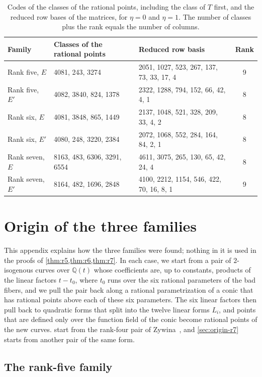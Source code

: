 \documentclass[12pt,oneside,openany]{book}
\theoremstyle{definition}
\theoremstyle{plain}
\numberwithin{equation}{chapter}
\theoremstyle{plain}
\theoremstyle{definition}
\theoremstyle{remark}
\newcommand{\Q}{\mathbb Q}
\begin{document}
\begin{table}[!htbp]
\centering\small
\begin{tabular}{@{}lllc@{}}
\toprule
Family & Classes of the rational points & Reduced row basis & Rank\\
\midrule
Rank five, $E$ & 4081, 243, 3274 & 2051, 1027, 523, 267, 137, 73, 33, 17, 4 & 9\\
Rank five, $E'$ & 4082, 3840, 824, 1378 & 2322, 1288, 794, 152, 66, 42, 4, 1 & 8\\
Rank six, $E$ & 4081, 3848, 865, 1449 & 2137, 1048, 521, 328, 209, 33, 4, 2 & 8\\
Rank six, $E'$ & 4080, 248, 3220, 2384 & 2072, 1068, 552, 284, 164, 84, 2, 1 & 8\\
Rank seven, $E$ & 8163, 483, 6306, 3291, 6554 & 4611, 3075, 265, 130, 65, 42, 24, 4 & 8\\
Rank seven, $E'$ & 8164, 482, 1696, 2848 & 4100, 2212, 1154, 546, 422, 70, 16, 8, 1 & 9\\
\bottomrule
\end{tabular}
\caption{Codes of the classes of the rational points, including the class of $T$ first, and the reduced row bases of the matrices, for $\eta=0$ and $\eta=1$. The number of classes plus the rank equals the number of columns.}
\label{tab:codes-classes}
\end{table}
\chapter{Origin of the three families}\label{app:origins}

This appendix explains how the three families were found; nothing in it is used in the proofs of \cref{thm:r5,thm:r6,thm:r7}. In each case, we start from a pair of $2$-isogenous curves over $\Q(t)$ whose coefficients are, up to constants, products of the linear factors $t-t_0$, where $t_0$ runs over the six rational parameters of the bad fibers, and we pull the pair back along a rational parametrization of a conic that has rational points above each of these six parameters. The six linear factors then pull back to quadratic forms that split into the twelve linear forms $L_i$, and points that are defined only over the function field of the conic become rational points of the new curves.  start from the rank-four pair of Zywina~\cite[\S6.5]{Zywina2026}, and \cref{sec:origin-r7} starts from another pair of the same form.

\section{The rank-five family}\label{sec:origin-r5}
\end{document}
